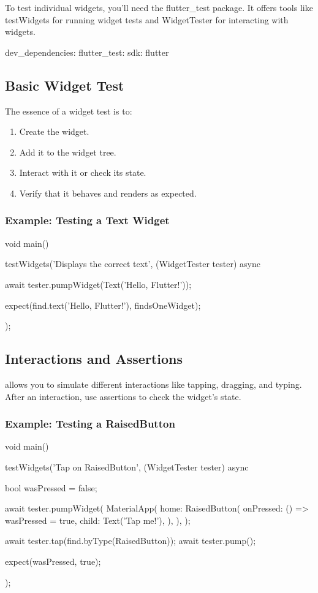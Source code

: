 To test individual widgets, you'll need the flutter\_test package. It offers tools like testWidgets for running widget tests and WidgetTester for interacting with widgets.

\begin{yamlcode}
dev_dependencies:
  flutter_test:
    sdk: flutter
\end{yamlcode}

\subsection*{Basic Widget Test}
The essence of a widget test is to:
\begin{enumerate}
 \item Create the widget.
 \item Add it to the widget tree.
 \item Interact with it or check its state.
 \item Verify that it behaves and renders as expected.
\end{enumerate}

\subsubsection*{Example: Testing a Text Widget}

\begin{dartcode}
void main() {
  testWidgets('Displays the correct text', (WidgetTester tester) async {
    await tester.pumpWidget(Text('Hello, Flutter!'));

    expect(find.text('Hello, Flutter!'), findsOneWidget);
  });
}
\end{dartcode}

\subsection*{Interactions and Assertions}

 allows you to simulate different interactions like tapping, dragging, and typing. After an interaction, use assertions to check the widget's state.

\subsubsection*{Example: Testing a RaisedButton}

\begin{dartcode}
void main() {
  testWidgets('Tap on RaisedButton', (WidgetTester tester) async {
    bool wasPressed = false;

    await tester.pumpWidget(
      MaterialApp(
        home: RaisedButton(
          onPressed: () => wasPressed = true,
          child: Text('Tap me!'),
        ),
      ),
    );

    await tester.tap(find.byType(RaisedButton));
    await tester.pump();

    expect(wasPressed, true);
  });
}
\end{dartcode}

